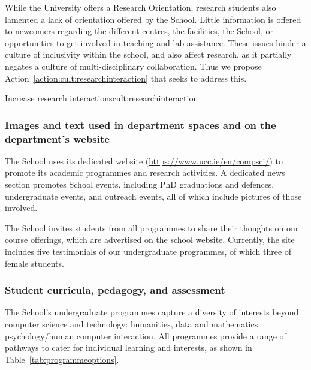 While the University offers a Research Orientation, research students also lamented a lack of orientation offered by the School.  Little information is offered to newcomers regarding the different centres, the facilities, the School, or opportunities to get involved in teaching and lab assistance.  %
These issues hinder a culture of inclusivity within the school, and also affect research, as it partially negates a culture of multi-disciplinary collaboration. 
Thus we propose Action~\ref{action:cult:researchinteraction} that seeks to address this.


\begin{actionblock}{\ksspace{}Increase research interactions}{cult:researchinteraction}
\actimproveinteraction
\hfill{
    \hypersetup{hidelinks}
    \hyperlink{e2}{\gotoactionsymbol{}}
}
\end{actionblock}



\subsubsection{Images and text used in department spaces and on the department's website}
The School uses its dedicated website (\url{https://www.ucc.ie/en/compsci/}) to promote its academic programmes and research activities. A dedicated news section promotes School events, including PhD graduations and defences, undergraduate events, and outreach events, all of which include pictures of those involved.  

The School invites students from all programmes to share their thoughts on our course offerings, which are advertised on the school website. Currently, the site includes five testimonials of our undergraduate programmes, of which three of female students.

\subsubsection{Student curricula, pedagogy, and assessment}
The School's undergraduate programmes capture a diversity of interests  beyond computer science and technology: humanities, data and mathematics, psychology/human computer interaction. All programmes provide a range of pathways to cater for individual learning and interests, as shown in Table~\ref{tab:programmeoptions}.


